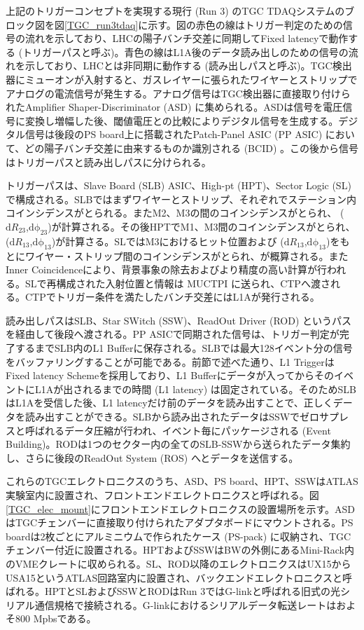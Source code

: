 上記のトリガーコンセプトを実現する現行 (Run 3) のTGC TDAQシステムのブロック図を図\ref{TGC_run3tdaq}に示す。図の赤色の線はトリガー判定のための信号の流れを示しており、LHCの陽子バンチ交差に同期してFixed latencyで動作する (トリガーパスと呼ぶ)。青色の線はL1A後のデータ読み出しのための信号の流れを示しており、LHCとは非同期に動作する (読み出しパスと呼ぶ)。TGC検出器にミューオンが入射すると、ガスレイヤーに張られたワイヤーとストリップでアナログの電流信号が発生する。アナログ信号はTGC検出器に直接取り付けられたAmplifier Shaper-Discriminator  (ASD) に集められる。ASDは信号を電圧信号に変換し増幅した後、閾値電圧との比較によりデジタル信号を生成する。デジタル信号は後段のPS board上に搭載されたPatch-Panel ASIC  (PP ASIC) において、どの陽子バンチ交差に由来するものか識別される  (BCID) 。この後から信号はトリガーパスと読み出しパスに分けられる。

トリガーパスは、Slave Board (SLB) ASIC、High-pt (HPT)、Sector Logic (SL) で構成される。SLBではまずワイヤーとストリップ、それぞれでステーション内コインシデンスがとられる。またM2、M3の間のコインシデンスがとられ、 ($\mathrm{d}R_{23}$,$\mathrm{d\phi_{23}}$)が計算される。その後HPTでM1、M3間のコインシデンスがとられ、($\mathrm{d}R_{13}$,$\mathrm{d\phi_{13}}$)が計算さる。SLではM3におけるヒット位置および ($\mathrm{d}R_{13}$,$\mathrm{d\phi_{13}}$)をもとにワイヤー・ストリップ間のコインシデンスがとられ、\pt が概算される。またInner Coincidenceにより、背景事象の除去およびより精度の高い\pt 計算が行われる。SLで再構成された入射位置と\pt 情報は MUCTPI に送られ、CTPへ渡される。CTPでトリガー条件を満たしたバンチ交差にはL1Aが発行される。

読み出しパスはSLB、Star SWitch (SSW)、ReadOut Driver (ROD) というパスを経由して後段へ渡される。PP ASICで同期された信号は、トリガー判定が完了するまでSLB内のL1 Bufferに保存される。SLBでは最大128イベント分の信号をバッファリングすることが可能である。前節で述べた通り、L1 TriggerはFixed latency Schemeを採用しており、L1 Bufferにデータが入ってからそのイベントにL1Aが出されるまでの時間  (L1 latency) は固定されている。そのためSLBはL1Aを受信した後、L1 latencyだけ前のデータを読み出すことで、正しくデータを読み出すことができる。SLBから読み出されたデータはSSWでゼロサプレスと呼ばれるデータ圧縮が行われ、イベント毎にパッケージされる  (Event Building)。RODは1つのセクター内の全てのSLB-SSWから送られたデータ集約し、さらに後段のReadOut System  (ROS) へとデータを送信する。

これらのTGCエレクトロニクスのうち、ASD、PS board、HPT、SSWはATLAS実験室内に設置され、フロントエンドエレクトロニクスと呼ばれる。図\ref{TGC_elec_mount}にフロントエンドエレクトロニクスの設置場所を示す。ASDはTGCチェンバーに直接取り付けられたアダプタボードにマウントされる。PS boardは2枚ごとにアルミニウムで作られたケース  (PS-pack) に収納され、TGCチェンバー付近に設置される。HPTおよびSSWはBWの外側にあるMini-Rack内のVMEクレートに収められる。SL、ROD以降のエレクトロニクスはUX15からUSA15というATLAS回路室内に設置され、バックエンドエレクトロニクスと呼ばれる。HPTとSLおよびSSWとRODはRun 3ではG-linkと呼ばれる旧式の光シリアル通信規格で接続される。G-linkにおけるシリアルデータ転送レートはおよそ800 Mpbsである。

